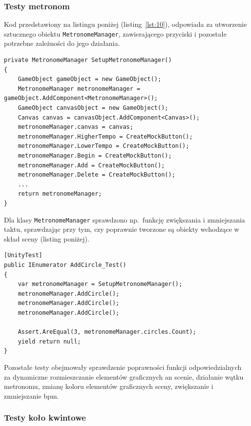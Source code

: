 \subsubsection{Testy metronom}

Kod przedstawiony na listingu poniżej (listing~\ref{lst:10}), odpowiada za utworzenie sztucznego obiektu \texttt{MetronomeManager}, zawierającego przyciski i pozostałe potrzebne zależności do jego działania. 

\begin{lstlisting}[style=sharpcstyle,caption=Funkcja \texttt{SetupMetronomeManager}, label=lst:10]
private MetronomeManager SetupMetronomeManager()
{
    GameObject gameObject = new GameObject();
    MetronomeManager metronomeManager = gameObject.AddComponent<MetronomeManager>();
    GameObject canvasObject = new GameObject();
    Canvas canvas = canvasObject.AddComponent<Canvas>();
    metronomeManager.canvas = canvas;
    metronomeManager.HigherTempo = CreateMockButton();
    metronomeManager.LowerTempo = CreateMockButton();
    metronomeManager.Begin = CreateMockButton();
    metronomeManager.Add = CreateMockButton();
    metronomeManager.Delete = CreateMockButton();
    ...
    return metronomeManager;
}
\end{lstlisting}

Dla klasy \texttt{MetronomeManager} sprawdzono np.\ funkcję zwiększania i zmniejszania taktu, sprawdzając przy tym, czy poprawnie tworzone są obiekty wchodzące w skład sceny (listing poniżej).

\begin{lstlisting}[style=sharpcstyle,caption=Funkcja \texttt{AddCircle\_Test}, label=lst:20]
[UnityTest]
public IEnumerator AddCircle_Test()
{
    var metronomeManager = SetupMetronomeManager();    
    metronomeManager.AddCircle();
    metronomeManager.AddCircle();
    metronomeManager.AddCircle();
    
    Assert.AreEqual(3, metronomeManager.circles.Count);
    yield return null;
}
\end{lstlisting}

Pozostałe testy obejmowały sprawdzenie poprawności funkcji odpowiedzialnych za dynamiczne rozmieszczanie elementów graficznych an scenie, działanie wątku metronomu, zmianę koloru elementów graficznych sceny, zwiększanie i zmniejszanie bpm.

\subsubsection{Testy koło kwintowe}

